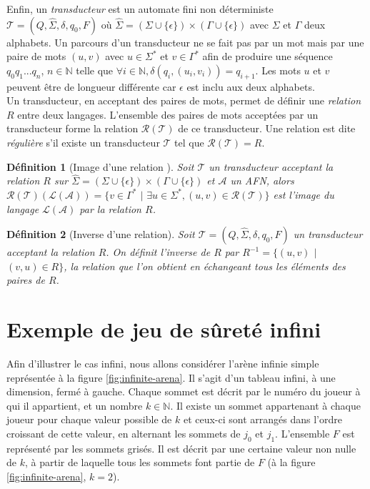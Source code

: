 \documentclass[12pt,a4paper,oneside,titlepage]{report}
\newtheorem{defi}{D\'efinition}[section]
\begin{document}
\noindent Enfin, un \emph{transducteur} est un automate fini non déterministe $\mathcal{T}=(Q,\hat{\Sigma},\delta,q_0,F)$ où $\hat{\Sigma}=(\Sigma\cup\{\epsilon\})\times(\Gamma\cup\{\epsilon\})$ avec $\Sigma$ et $\Gamma$ deux alphabets. Un parcours d'un transducteur ne se fait pas par un mot mais par une paire de mots $(u,v)$ avec $u\in\Sigma^*$ et $v\in\Gamma^*$ afin de produire une séquence $q_0q_1...q_n$, $n\in\mathbb{N}$ telle que $\forall i\in\mathbb{N}, \delta(q_i,(u_i,v_i))=q_{i+1}$. Les mots $u$ et $v$ peuvent être de longueur différente car $\epsilon$ est inclu aux deux alphabets.\\
Un transducteur, en acceptant des paires de mots, permet de définir une \emph{relation} $R$ entre deux langages. L'ensemble des paires de mots acceptées par un transducteur forme la relation $\mathcal{R}(\mathcal{T})$ de ce transducteur. Une relation est dite \emph{régulière} s'il existe un transducteur $\mathcal{T}$ tel que $\mathcal{R}(\mathcal{T})=R$.
\begin{defi}[Image d'une relation \cite{NeiderThesis}]
Soit $\mathcal{T}$ un transducteur acceptant la relation $R$ sur $\hat{\Sigma}=(\Sigma\cup\{\epsilon\})\times(\Gamma\cup\{\epsilon\})$ et $\mathcal{A}$ un AFN, alors\\ $\mathcal{R}(\mathcal{T})(\mathcal{L}(\mathcal{A}))=\{v\in\Gamma^*$ $|$ $\exists u\in\Sigma^*, (u,v)\in\mathcal{R}(\mathcal{T})\}$ est l'image du langage $\mathcal{L}(\mathcal{A})$ par la relation $R$.
\end{defi}
\begin{defi}[Inverse d'une relation]
Soit $\mathcal{T}=(Q,\hat{\Sigma},\delta,q_0,F)$ un transducteur acceptant la relation $R$. On définit l'inverse de $R$ par $R^{-1}=\{(u,v)$ $|$ $(v,u)\in R\}$, la relation que l'on obtient en échangeant tous les éléments des paires de $R$.
\end{defi}

\section{Exemple de jeu de sûreté infini}
\label{secexemple}
Afin d'illustrer le cas infini, nous allons considérer l'arène infinie simple représentée à la figure \ref{fig:infinite-arena}. Il s'agit d'un tableau infini, à une dimension, fermé à gauche. Chaque sommet est décrit par le numéro du joueur à qui il appartient, et un nombre $k\in\mathbb{N}$. Il existe un sommet appartenant à chaque joueur pour chaque valeur possible de $k$ et ceux-ci sont arrangés dans l'ordre croissant de cette valeur, en alternant les sommets de $j_0$ et $j_1$. L'ensemble $F$ est représenté par les sommets grisés. Il est décrit par une certaine valeur non nulle de $k$, à partir de laquelle tous les sommets font partie de $F$ (à la figure \ref{fig:infinite-arena}, $k=2$).
\end{document}
